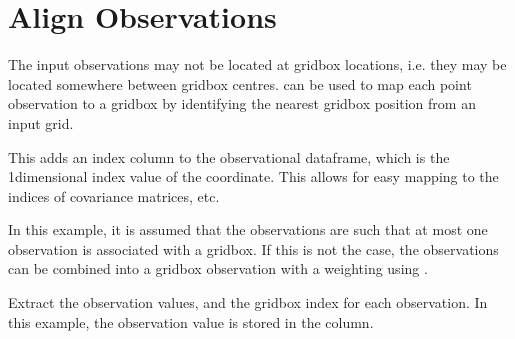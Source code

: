 \documentclass[letterpaper,10pt,english]{sphinxmanual}
\begin{document}
\section{Align Observations}
\label{\detokenize{workflow:align-observations}}
\sphinxAtStartPar
The input observations may not be located at grid\sphinxhyphen{}box locations, i.e. they may be located somewhere
between grid\sphinxhyphen{}box centres. {\hyperref[\detokenize{kriging:glomar_gridding.grid.map_to_grid}]{}} can be used to map each point
observation to a grid\sphinxhyphen{}box by identifying the nearest grid\sphinxhyphen{}box position from an input grid.

\sphinxAtStartPar
This adds an index column to the observational data\sphinxhyphen{}frame, which is the 1\sphinxhyphen{}dimensional index value of
the coordinate. This allows for easy mapping to the indices of covariance matrices, etc.

\begin{sphinxVerbatim}[commandchars=\\\{\}]
  
\end{sphinxVerbatim}

\sphinxAtStartPar
In this example, it is assumed that the observations are such that at most one observation is
associated with a grid\sphinxhyphen{}box. If this is not the case, the observations can be combined into a
grid\sphinxhyphen{}box \sphinxhyphen{}observation with a weighting using
{\hyperref[\detokenize{kriging:glomar_gridding.kriging.prep_obs_for_kriging}]{}}.

\sphinxAtStartPar
Extract the observation values, and the grid\sphinxhyphen{}box index for each observation. In this example, the
observation value is stored in the  column.

\begin{sphinxVerbatim}[commandchars=\\\{\}]
  \PYG{p}{[}\PYG{p}{]}
  \PYG{p}{[}\PYG{p}{]}
\end{sphinxVerbatim}
\end{document}

